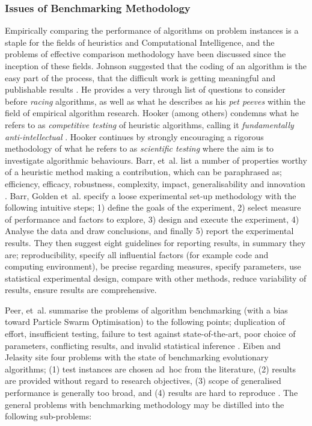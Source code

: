 \subsubsection{Issues of Benchmarking Methodology}
Empirically comparing the performance of algorithms on problem instances is a staple for the fields of heuristics and Computational Intelligence, and the problems of effective comparison methodology have been discussed since the inception of these fields. Johnson suggested that the coding of an algorithm is the easy part of the process, that the difficult work is getting meaningful and publishable results \cite{Johnson2002}. He provides a very through list of questions to consider before \emph{racing} algorithms, as well as what he describes as his \emph{pet peeves} within the field of empirical algorithm research. Hooker (among others) condemns what he refers to as \emph{competitive testing} of heuristic algorithms, calling it \emph{fundamentally anti-intellectual} \cite{Hooker1995}. Hooker continues by strongly encouraging a rigorous methodology of what he refers to as \emph{scientific testing} where the aim is to investigate algorithmic behaviours. Barr, et~al. list a number of properties worthy of a heuristic method making a contribution, which can be paraphrased as; efficiency, efficacy, robustness, complexity, impact, generalisability and innovation \cite{Barr1995}. Barr, Golden et~al. specify a loose experimental set-up methodology with the following intuitive steps; 1) define the goals of the experiment, 2) select measure of performance and factors to explore, 3) design and execute the experiment, 4) Analyse the data and draw conclusions, and finally 5) report the experimental results. They then suggest eight guidelines for reporting results, in summary they are; reproducibility, specify all influential factors (for example code and computing environment), be precise regarding measures, specify parameters, use statistical experimental design, compare with other methods, reduce variability of results, ensure results are comprehensive. 

Peer, et~al. summarise the problems of algorithm benchmarking (with a bias toward Particle Swarm Optimisation) to the following points; duplication of effort, insufficient testing, failure to test against state-of-the-art, poor choice of parameters, conflicting results, and invalid statistical inference \cite{Peer2003}. Eiben and Jelasity site four problems with the state of benchmarking evolutionary algorithms; (1) test instances are chosen ad~hoc from the literature, (2) results are provided without regard to research objectives, (3) scope of generalised performance is generally too broad, and (4) results are hard to reproduce \cite{Eiben2002}. 
The general problems with benchmarking methodology may be distilled into the following sub-problems:

